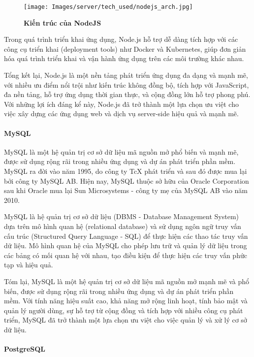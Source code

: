 \begin{figure}[H]
  \centering
  \texttt{[image: Images/server/tech\_used/nodejs\_arch.jpg]}
  \caption[Kiến trúc của NodeJS]{\bfseries \fontsize{12pt}{0pt}
  \selectfont Kiến trúc của NodeJS}
  \label{ble_services} %
\end{figure}
Trong quá trình triển khai ứng dụng, Node.js hỗ trợ dễ dàng tích hợp với các công cụ triển khai (deployment tools) như Docker và Kubernetes, giúp đơn giản hóa quá trình triển khai và vận hành ứng dụng trên các môi trường khác nhau.

Tổng kết lại, Node.js là một nền tảng phát triển ứng dụng đa dạng và mạnh mẽ, với nhiều ưu điểm nổi trội như kiến trúc không đồng bộ, tích hợp với JavaScript, đa nền tảng, hỗ trợ ứng dụng thời gian thực, và cộng đồng lớn hỗ trợ phong phú. Với những lợi ích đáng kể này, Node.js đã trở thành một lựa chọn ưu việt cho việc xây dựng các ứng dụng web và dịch vụ server-side hiệu quả và mạnh mẽ.

\paragraph{MySQL}
\mbox{}

MySQL là một hệ quản trị cơ sở dữ liệu mã nguồn mở phổ biến và mạnh mẽ, được sử dụng rộng rãi trong nhiều ứng dụng và dự án phát triển phần mềm. MySQL ra đời vào năm 1995, do công ty TcX phát triển và sau đó được mua lại bởi công ty MySQL AB. Hiện nay, MySQL thuộc sở hữu của Oracle Corporation sau khi Oracle mua lại Sun Microsystems - công ty mẹ của MySQL AB vào năm 2010. \cite{mysql_1}

MySQL là hệ quản trị cơ sở dữ liệu (DBMS - Database Management System) dựa trên mô hình quan hệ (relational database) và sử dụng ngôn ngữ truy vấn cấu trúc (Structured Query Language - SQL) để thực hiện các thao tác truy vấn dữ liệu. Mô hình quan hệ của MySQL cho phép lưu trữ và quản lý dữ liệu trong các bảng có mối quan hệ với nhau, tạo điều kiện để thực hiện các truy vấn phức tạp và hiệu quả. \cite{myql_2}

Tóm lại, MySQL là một hệ quản trị cơ sở dữ liệu mã nguồn mở mạnh mẽ và phổ biến, được sử dụng rộng rãi trong nhiều ứng dụng và dự án phát triển phần mềm. Với tính năng hiệu suất cao, khả năng mở rộng linh hoạt, tính bảo mật và quản lý người dùng, sự hỗ trợ từ cộng đồng và tích hợp với nhiều công cụ phát triển, MySQL đã trở thành một lựa chọn ưu việt cho việc quản lý và xử lý cơ sở dữ liệu.

\paragraph{PostgreSQL}
\mbox{}

